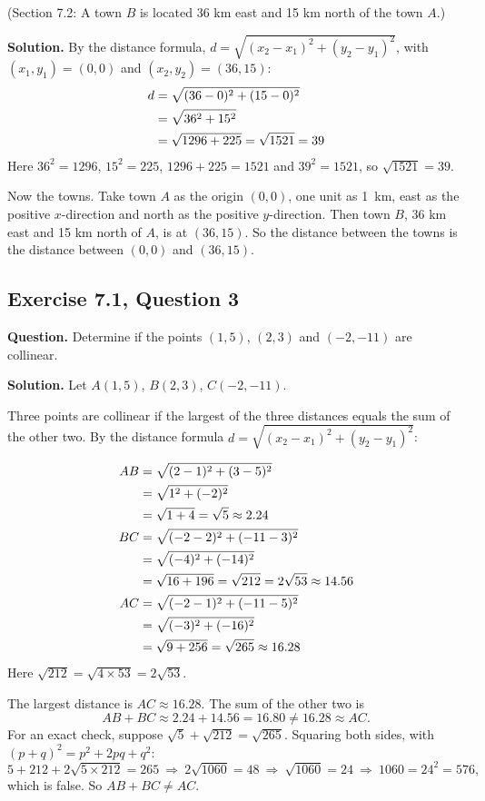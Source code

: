 (Section 7.2: A town $B$ is located 36 km east and 15 km north of the town $A$.)

\textbf{Solution.} By the distance formula, $d=\sqrt{(x_2-x_1)^2+(y_2-y_1)^2}$, with $(x_1,y_1)=(0,0)$ and $(x_2,y_2)=(36,15)$:
\begin{align*}
\dist{d}{0}{0}{36}{15}{39}
\end{align*}
Here $36^2=1296$, $15^2=225$, $1296+225=1521$ and $39^2=1521$, so $\sqrt{1521}=39$.

Now the towns. Take town $A$ as the origin $(0,0)$, one unit as 1~km, east as the positive $x$-direction and north as the positive $y$-direction. Then town $B$, 36 km east and 15 km north of $A$, is at $(36,15)$. So the distance between the towns is the distance between $(0,0)$ and $(36,15)$.


\subsection*{Exercise 7.1, Question 3}
\textbf{Question.} Determine if the points $(1,5)$, $(2,3)$ and $(-2,-11)$ are collinear.

\textbf{Solution.} Let $A(1,5)$, $B(2,3)$, $C(-2,-11)$.

Three points are collinear if the largest of the three distances equals the sum of the other two. By the distance formula $d=\sqrt{(x_2-x_1)^2+(y_2-y_1)^2}$:

\distnote
\begin{align*}
\distn{AB}{1}{5}{2}{3}\approx2.24\\
\dist{BC}{2}{3}{-2}{-11}{2\sqrt{53}\approx14.56}\\
\distn{AC}{1}{5}{-2}{-11}\approx16.28
\end{align*}
Here $\sqrt{212}=\sqrt{4\times53}=2\sqrt{53}$.

The largest distance is $AC\approx16.28$. The sum of the other two is
\[AB+BC\approx2.24+14.56=16.80\neq16.28\approx AC.\]
For an exact check, suppose $\sqrt5+\sqrt{212}=\sqrt{265}$. Squaring both sides, with $(p+q)^2=p^2+2pq+q^2$:
\[5+212+2\sqrt{5\times212}=265\ \Rightarrow\ 2\sqrt{1060}=48\ \Rightarrow\ \sqrt{1060}=24\ \Rightarrow\ 1060=24^2=576,\]
which is false. So $AB+BC\neq AC$.

